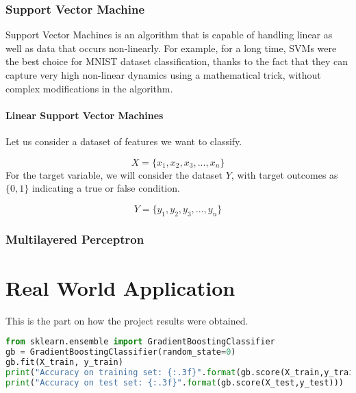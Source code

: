 \documentclass[12pt]{article}
\begin{document}
\newpage
\section{Support Vector Machine}
Support Vector Machines is an algorithm that is capable of handling 
linear as well as data that occurs non-linearly. For example, for a long time, SVMs were the best
choice for MNIST dataset classification, thanks to the fact that they can capture very high
non-linear dynamics using a mathematical trick, without complex modifications in the
algorithm.

\subsection{Linear Support Vector Machines}
Let us consider a dataset of features we want to classify.

$$
X = \lbrace x_{1}, x_{2}, x_{3}, ... , x_{n} \rbrace 
$$ For the target variable, we will consider the dataset $Y$, with target outcomes as $\lbrace0,1\rbrace$ indicating a true or false condition.

$$
Y = \lbrace y_{1}, y_{2}, y_{3}, ... , y_{n} \rbrace 
$$

\newpage
\section{Multilayered Perceptron}

\newpage
\part{Real World Application}
This is the part on how the project results were obtained.\\

 
\lstset{style=mystyle}

\begin{lstlisting}[language=Python]
from sklearn.ensemble import GradientBoostingClassifier
gb = GradientBoostingClassifier(random_state=0)
gb.fit(X_train, y_train)
print("Accuracy on training set: {:.3f}".format(gb.score(X_train,y_train)))
print("Accuracy on test set: {:.3f}".format(gb.score(X_test,y_test)))
\end{lstlisting}
\end{document}
